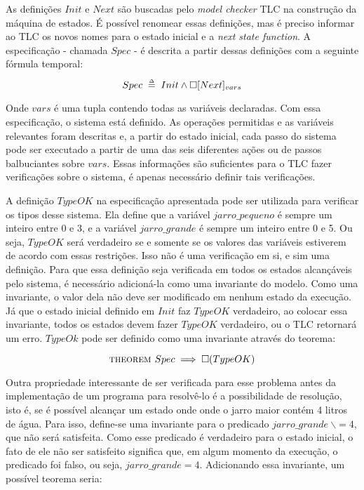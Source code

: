 As definições $Init$ e $Next$ são buscadas pelo \textit{model checker} TLC na construção da máquina de estados. É possível renomear essas definições, mas é preciso informar ao TLC os novos nomes para o estado inicial e a \textit{next state function}. A especificação - chamada $Spec$ - é descrita a partir dessas definições com a seguinte fórmula temporal:

\[Spec \;\mathrel{\smash {{\stackrel{\scriptscriptstyle\Delta}{=}}}}\; Init \land \square [Next]_{vars}\]

Onde $vars$ é uma tupla contendo todas as variáveis declaradas. Com essa especificação, o sistema está definido. As operações permitidas e as variáveis relevantes foram descritas e, a partir do estado inicial, cada passo do sistema pode ser executado a partir de uma das seis diferentes ações ou de passos balbuciantes sobre $vars$. Essas informações são suficientes para o TLC fazer verificações sobre o sistema, é apenas necessário definir tais verificações.

A definição $TypeOK$ na especificação apresentada pode ser utilizada para verificar os tipos desse sistema. Ela define que a variável $jarro\_pequeno$ é sempre um inteiro entre 0 e 3, e a variável $jarro\_grande$ é sempre um inteiro entre 0 e 5. Ou seja, $TypeOK$ será verdadeiro se e somente se os valores das variáveis estiverem de acordo com essas restrições. Isso não é uma verificação em si, e sim uma definição. Para que essa definição seja verificada em todos os estados alcançáveis pelo sistema, é necessário adicioná-la como uma invariante do modelo. Como uma invariante, o valor dela não deve ser modificado em nenhum estado da execução. Já que o estado inicial definido em $Init$ faz $TypeOK$ verdadeiro, ao colocar essa invariante, todos os estados devem fazer $TypeOK$ verdadeiro, ou o TLC retornará um erro. $TypeOk$ pode ser definido como uma invariante através do teorema:

\[\textsc{theorem } Spec \implies \square (TypeOK)\]

Outra propriedade interessante de ser verificada para esse problema antes da implementação de um programa para resolvê-lo é a possibilidade de resolução, isto é, se é possível alcançar um estado onde onde o jarro maior contém 4 litros de água. Para isso, define-se uma invariante para o predicado $jarro\_grande\ \backslash= 4$, que não será satisfeita. Como esse predicado é verdadeiro para o estado inicial, o fato de ele não ser satisfeito significa que, em algum momento da execução, o predicado foi falso, ou seja, $jarro\_grande = 4$. Adicionando essa invariante, um possível teorema seria:


